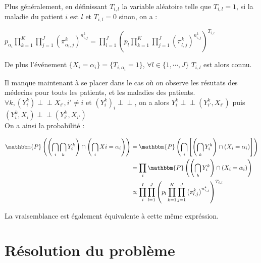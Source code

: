 \documentclass[frenchb]{report}
\newcommand{\1}{\mathbbm{1}}
\newcommand{\prob}{\mathbbm{P}}
\newcommand{\indep}{\perp \!\!\! \perp}
\theoremstyle{definition}\newtheorem{defn}{Définition}
\theoremstyle{definition}\newtheorem{exm}{Exemple}
\theoremstyle{definition}\newtheorem{nota}{Notation}
\theoremstyle{definition}\newtheorem{rem}{Remarque}
\begin{document}
Plus généralement, en définissant $T_{i,l}$ la variable aléatoire telle que $T_{i,l} = 1$, si la maladie du patient $i$ est $l$ et $T_{i,l} = 0$ sinon, on a : \\

\begin{center}
	$p_{\alpha_i} \displaystyle \prod_{k=1}^K \displaystyle \prod_{j = 1}^J \left(\pi^k_{\alpha_i,j}\right)^{n^k_{i,j}} = \displaystyle \prod_{l=1}^J \left( p_l \displaystyle \prod_{k=1}^K \displaystyle \prod_{j = 1}^J \left(\pi^k_{l,j}\right)^{n^k_{i,j}} \right)^{T_{i,l}}$
\end{center}

De plus l'événement $\{X_i = \alpha_i \} = \{T_{i,\alpha_i} = 1\}$, $\forall l \in \{1, \cdots, J\}$ $T_{i,l}$ est alors connu.

\newpage

Il manque maintenant à se placer dans le cas où on observe les résutats des médecins pour touts les patients, et les maladies des patients.\\

$\forall k, (Y^k_i) \indep X_{i'}, i' \neq i$ et $(Y^k_i)_i \indep $, on a alors $Y^k_i \indep (Y^k_{i'},X_{i'})$ puis $(Y^k_i,X_i) \indep (Y^k_{i'},X_{i'})$\\
On a ainsi la probabilité : 

\begin{center}
	\begin{align*}
		\prob \left( \left( \displaystyle \bigcap_i \displaystyle \bigcap_k Y^k_i \right) \cap \left( \displaystyle \bigcap_i Xi = \alpha_i \right) \right) &= \prob \left( \displaystyle \bigcap_i \left[ \left( \displaystyle \bigcap_k Y^k_i \right) \cap \left(X_i = \alpha_i\right) \right] \right)\\
	&= \displaystyle \prod_i \prob \left( \left( \displaystyle \bigcap_k Y^k_i \right) \cap \left( X_i = \alpha_i \right) \right)\\
	&\propto \displaystyle \prod_i^I \displaystyle \prod_{l=1}^J \left( p_l \displaystyle \prod_{k=1}^K \displaystyle \prod_{j = 1}^J \left(\pi^k_{l,j}\right)^{n^k_{i,j}} \right)^{T_{i,l}}\\
	\end{align*}
\end{center}

La vraisemblance est également équivalente à cette même expréssion.

\section{Résolution du problème}
\end{document}

